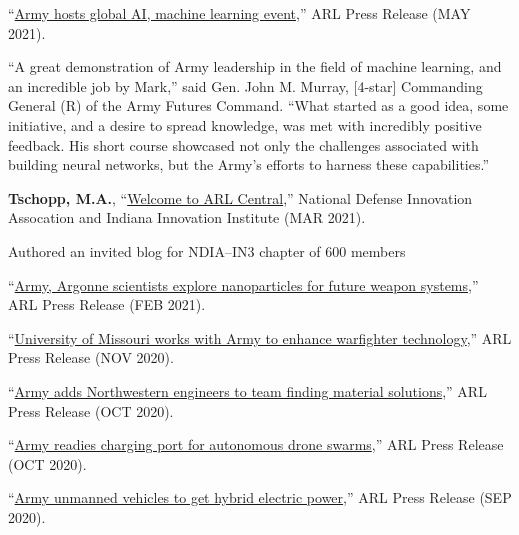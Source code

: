 \begin{cvlist}
\item ``\href{https://www.army.mil/article/246398/army_hosts_global_ai_machine_learning_event}{Army hosts global AI, machine learning event},'' ARL Press Release (MAY 2021).
\begin{list2}
\item[$\star$] ``A great demonstration of Army leadership in the field of machine learning, and an incredible job by Mark,'' said Gen. John M. Murray, [4-star] Commanding General (R) of the Army Futures Command. ``What started as a good idea, some initiative, and a desire to spread knowledge, was met with incredibly positive feedback. His short course showcased not only the challenges associated with building neural networks, but the Army's efforts to harness these capabilities.''
\end{list2}

\item
\textbf{Tschopp, M.A.}, ``\href{https://www.ndiaindiana.com/news/welcome-to-arl-central}{Welcome to ARL Central},'' National Defense Innovation Assocation and Indiana Innovation Institute (MAR 2021).
\begin{list2}
\item[$\star$] Authored an invited blog for NDIA--IN3 chapter of 600 members
\end{list2}

\item
``\href{https://www.army.mil/article/243587/army_argonne_scientists_explore_nanoparticles_for_future_weapon_systems}{Army, Argonne scientists explore nanoparticles for future weapon systems},'' ARL Press Release (FEB 2021).

\item
``\href{https://www.army.mil/article/240740/university_of_missouri_works_with_army_to_enhance_warfighter_technology}{University of Missouri works with Army to enhance warfighter technology},'' ARL Press Release (NOV 2020).

\item
``\href{https://www.army.mil/article/240059/army_adds_northwestern_engineers_to_team_finding_material_solutions}{Army adds Northwestern engineers to team finding material solutions},'' ARL Press Release (OCT 2020).

\item
``\href{https://www.army.mil/article/239661/army_readies_charging_port_for_autonomous_drone_swarms}{Army readies charging port for autonomous drone swarms},'' ARL Press Release (OCT 2020).

\item
``\href{https://www.army.mil/article/239529/army_unmanned_vehicles_to_get_hybrid_electric_power}{Army unmanned vehicles to get hybrid electric power},'' ARL Press Release (SEP 2020).


\end{cvlist}

